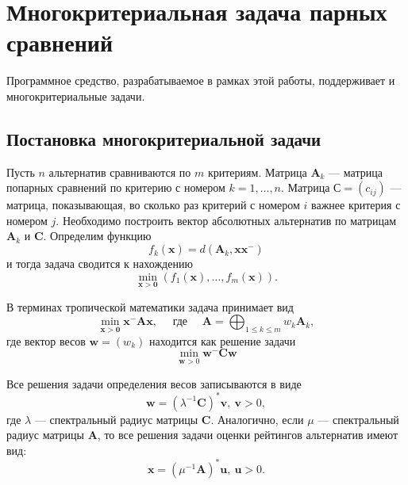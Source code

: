 \documentclass[specialist,
  substylefile = spbu.rtx,
  href,
  colorlinks=true,
  12pt]{disser}
\begin{document}
\section{Многокритериальная задача парных сравнений}
Программное средство, разрабатываемое в рамках этой работы, поддерживает и многокритериальные задачи.

\subsection{Постановка многокритериальной задачи}

Пусть $n$ альтернатив сравниваются по $m$ критериям.
Матрица $\boldsymbol{A}_k$ --- матрица попарных сравнений по критерию с номером $k = 1, \dots, n$.
Матрица $\boldsymbol{С} = (c_{ij})$ --- матрица, показывающая, во сколько раз критерий с номером $i$ важнее критерия с номером $j$. Необходимо построить вектор абсолютных альтернатив по матрицам $\boldsymbol{A}_k$ и $\boldsymbol{C}$.
Определим функцию
$$
f_{k}(\boldsymbol{x})=d\left(\boldsymbol{A}_{k}, \boldsymbol{x} \boldsymbol{x}^{-}\right)	
$$ и тогда задача сводится к нахождению
$$
\min _{\boldsymbol{x}>\mathbf{0}}\left(f_{1}(\boldsymbol{x}), \ldots, f_{m}(\boldsymbol{x})\right).
$$

В терминах тропической математики задача принимает вид
$$
\min _{\boldsymbol{x}>\mathbf{0}} \boldsymbol{x}^{-} \boldsymbol{A} \boldsymbol{x}, \quad \text { где } \quad \boldsymbol{A}=\bigoplus_{1 \leq k \leq m} w_{k} \boldsymbol{A}_{k},
$$
где вектор весов $\boldsymbol{w}=\left(w_{k}\right)$ находится как решение задачи
\[
\min _{\boldsymbol{w}>0} \boldsymbol{w}^{-} \boldsymbol{C} \boldsymbol{w}
\]

Все решения задачи определения весов записываются в виде
\[
	\boldsymbol{w} = (\lambda^{-1}\boldsymbol{C})^*\boldsymbol{v}, ~\boldsymbol{v} > 0,
\]
где $\lambda$ --- спектральный радиус матрицы $\boldsymbol{C}$. Аналогично, если $\mu$ --- спектральный радиус матрицы $\boldsymbol{A}$, то все решения задачи оценки рейтингов альтернатив имеют вид: 
\[
	\boldsymbol{x} = (\mu^{-1}\boldsymbol{A})^*\boldsymbol{u},~\boldsymbol{u} > 0.
\]
\end{document}
